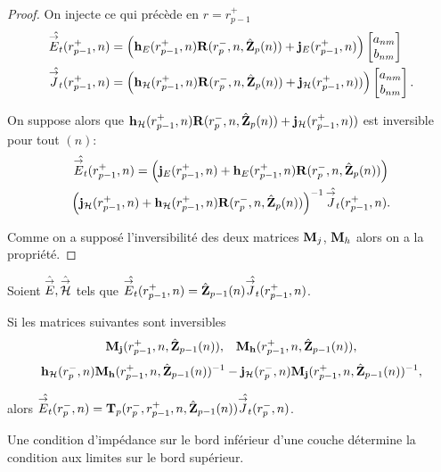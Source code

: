 \begin{proof}
      On injecte ce qui précède en \(r = r_{p-1}^+\)
      \begin{align*}
        \hat{{\overset{\rightarrow}{E}}_t}(r_{p-1}^+,n) &= 
        \left(\mathbf{h}_{E}(r_{p-1}^+,n)\mathbf{R}(r_{p}^-,n,\hat{\mathbf{Z}}_p(n)) + \mathbf{j}_{E}(r_{p-1}^+,n)\right)
        \begin{bmatrix}
          a_{nm} \\
          b_{nm}
        \end{bmatrix}
        \\
        \hat{{\overset{\rightarrow}{J}}_t}(r_{p-1}^+,n) &=
        \left(\mathbf{h}_{\mathcal{H}}(r_{p-1}^+,n)\mathbf{R}(r_{p}^-,n,\hat{\mathbf{Z}}_p(n)) + \mathbf{j}_{\mathcal{H}}(r_{p-1}^+,n))\right)
        \begin{bmatrix}
          a_{nm} \\
          b_{nm}
        \end{bmatrix}.
      \end{align*}

      On suppose alors que \(\mathbf{h}_{\mathcal{H}}(r_{p-1}^+,n)\mathbf{R}(r_{p}^-,n,\hat{\mathbf{Z}}_p(n)) + \mathbf{j}_{\mathcal{H}}(r_{p-1}^+,n))\) est inversible pour tout \((n)\):
      \begin{multline*}
        \hat{{\overset{\rightarrow}{E}}_t}(r_{p-1}^+,n) =
        \left(\mathbf{j}_{E}(r_{p-1}^+,n) + \mathbf{h}_{E}(r_{p-1}^+,n)\mathbf{R}(r_{p}^-,n,\hat{\mathbf{Z}}_p(n))\right) \\
        \left(\mathbf{j}_{\mathcal{H}}(r_{p-1}^+,n) + \mathbf{h}_{\mathcal{H}}(r_{p-1}^+,n)\mathbf{R}(r_{p}^-,n,\hat{\mathbf{Z}}_p(n))\right)^{-1}
        \hat{{\overset{\rightarrow}{J}}_t}(r_{p-1}^+,n).
      \end{multline*}

      Comme on a supposé l'inversibilité des deux matrices \(\mathbf{M}_j\), \(\mathbf{M}_h\) alors on a la propriété.
    \end{proof}

    \begin{prop}%
      \label{prop:sphere:relevement:impedance}

      Soient \(\hat{{\overset{\rightarrow}{E}}},\hat{{\overset{\rightarrow}{\mathcal{H}}}}\) tels que \(\hat{{\overset{\rightarrow}{E}}_t}(r_{p-1}^+,n) = \hat{\mathbf{Z}}_{p-1}(n)\hat{{\overset{\rightarrow}{J}}_t}(r_{p-1}^+,n)\).

      Si les matrices suivantes sont inversibles
      \begin{align*}
        \mathbf{M}_{\mathbf{j}}(r_{p-1}^+,n,\hat{\mathbf{Z}}_{p-1}(n)), && \mathbf{M}_{\mathbf{h}}(r_{p-1}^+,n,\hat{\mathbf{Z}}_{p-1}(n)),
      \end{align*}
      \begin{align*}
        \mathbf{h}_{\mathcal{H}}(r_{p}^-,n)\mathbf{M}_{\mathbf{h}}(r_{p-1}^+,n,\hat{\mathbf{Z}}_{p-1}(n))^{-1} - \mathbf{j}_{\mathcal{H}}(r_{p}^-,n)\mathbf{M}_{\mathbf{j}}(r_{p-1}^+,n,\hat{\mathbf{Z}}_{p-1}(n))^{-1},
      \end{align*}

      alors \(\hat{{\overset{\rightarrow}{E}}_t}(r_{p}^-,n) = \mathbf{T}_p(r_p^-,r_{p-1}^+,n,\hat{\mathbf{Z}}_{p-1}(n))\hat{{\overset{\rightarrow}{J}}_t}(r_{p}^-,n)\).

      Une condition d'impédance sur le bord inférieur d'une couche détermine la condition aux limites sur le bord supérieur.
    \end{prop}

